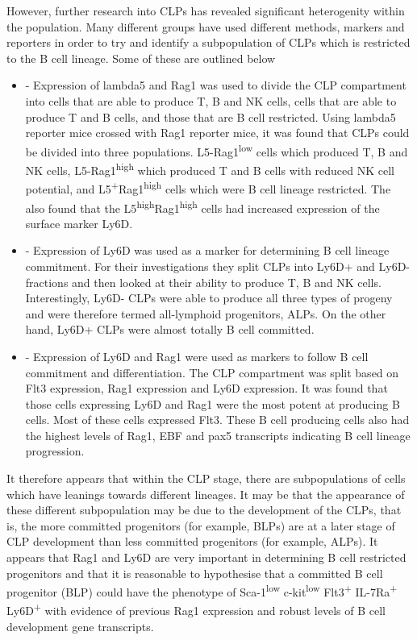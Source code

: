 However, further research into CLPs has revealed significant heterogenity within the population.
Many different groups have used different methods, markers and reporters in order to try and identify a subpopulation of CLPs which is restricted to the B cell lineage. 
Some of these are outlined below
\begin{itemize}
\item \citet{Mansson2010} - Expression of lambda5 and Rag1 was used to divide the CLP compartment into cells that are able to produce T, B and NK cells, cells that are able to produce T and B cells, and those that are B cell restricted.
Using lambda5 reporter mice crossed with Rag1 reporter mice, it was found that CLPs could be divided into three populations.
L5-Rag1\textsuperscript{low} cells which produced T, B and NK cells, L5-Rag1\textsuperscript{high} which produced T and B cells with reduced NK cell potential, and L5\textsuperscript{+}Rag1\textsuperscript{high} cells which were B cell lineage restricted.
The also found that the L5\textsuperscript{high}Rag1\textsuperscript{high} cells had increased expression of the surface marker Ly6D.
\item \citet{Inlay2009} - Expression of Ly6D was used as a marker for determining B cell lineage commitment.
For their investigations they split CLPs into Ly6D+ and Ly6D- fractions and then looked at their ability to produce T, B and NK cells.
Interestingly, Ly6D- CLPs were able to produce all three types of progeny and were therefore termed all-lymphoid progenitors, ALPs.
On the other hand, Ly6D+ CLPs were almost totally B cell committed.
\item \citet{Zhang2013} - Expression of Ly6D and Rag1 were used as markers to follow B cell commitment and differentiation.
The CLP compartment was split based on Flt3 expression, Rag1 expression and Ly6D expression.
It was found that those cells expressing Ly6D and Rag1 were the most potent at producing B cells. 
Most of these cells expressed Flt3.
These B cell producing cells also had the highest levels of Rag1, EBF and pax5 transcripts indicating B cell lineage progression.
\end{itemize}

It therefore appears that within the CLP stage, there are subpopulations of cells which have leanings towards different lineages.
It may be that the appearance of these different subpopulation may be due to the development of the CLPs, that is, the more committed progenitors (for example, BLPs) are at a later stage of CLP development than less committed progenitors (for example, ALPs).
It appears that Rag1 and Ly6D are very important in determining B cell restricted progenitors and that it is reasonable to hypothesise that a committed B cell progenitor (BLP) could have the phenotype of Sca-1\textsuperscript{low} c-kit\textsuperscript{low} Flt3\textsuperscript{+} IL-7Ra\textsuperscript{+} Ly6D\textsuperscript{+} with evidence of previous Rag1 expression and robust levels of B cell development gene transcripts.

